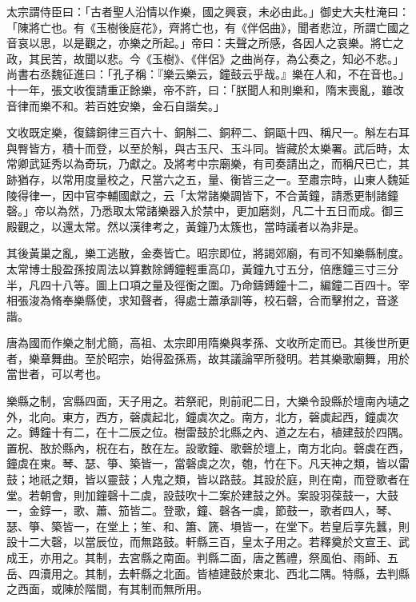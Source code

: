 \begin{pinyinscope}
 太宗謂侍臣曰：「古者聖人沿情以作樂，國之興衰，未必由此。」御史大夫杜淹曰：「陳將亡也。有《玉樹後庭花》，齊將亡也，有《伴侶曲》，聞者悲泣，所謂亡國之音哀以思，以是觀之，亦樂之所起。」帝曰：夫聲之所感，各因人之哀樂。將亡之政，其民苦，故聞以悲。今《玉樹》、《伴侶》之曲尚存，為公奏之，知必不悲。」尚書右丞魏征進曰：「孔子稱：『樂云樂云，鐘鼓云乎哉。』樂在人和，不在音也。」十一年，張文收復請重正餘樂，帝不許，曰：「朕聞人和則樂和，隋末喪亂，雖改音律而樂不和。若百姓安樂，金石自諧矣。」



 文收既定樂，復鑄銅律三百六十、銅斛二、銅秤二、銅甌十四、稱尺一。斛左右耳與臀皆方，積十而登，以至於斛，與古玉尺、玉斗同。皆藏於太樂署。武后時，太常卿武延秀以為奇玩，乃獻之。及將考中宗廟樂，有司奏請出之，而稱尺已亡，其跡猶存，以常用度量校之，尺當六之五，量、衡皆三之一。至肅宗時，山東人魏延陵得律一，因中官李輔國獻之，云「太常諸樂調皆下，不合黃鐘，請悉更制諸鐘磬。」帝以為然，乃悉取太常諸樂器入於禁中，更加磨剡，凡二十五日而成。御三殿觀之，以還太常。然以漢律考之，黃鐘乃太簇也，當時議者以為非是。



 其後黃巢之亂，樂工逃散，金奏皆亡。昭宗即位，將謁郊廟，有司不知樂縣制度。太常博士殷盈孫按周法以算數除鎛鐘輕重高卬，黃鐘九寸五分，倍應鐘三寸三分半，凡四十八等。圖上口項之量及徑衡之圍。乃命鑄鎛鐘十二，編鐘二百四十。宰相張浚為脩奉樂縣使，求知聲者，得處士蕭承訓等，校石磬，合而擊拊之，音遂諧。



 唐為國而作樂之制尤簡，高祖、太宗即用隋樂與孝孫、文收所定而已。其後世所更者，樂章舞曲。至於昭宗，始得盈孫焉，故其議論罕所發明。若其樂歌廟舞，用於當世者，可以考也。



 樂縣之制，宮縣四面，天子用之。若祭祀，則前祀二日，大樂令設縣於壇南內壝之外，北向。東方，西方，磬虡起北，鐘虡次之。南方，北方，磬虡起西，鐘虡次之。鎛鐘十有二，在十二辰之位。樹雷鼓於北縣之內、道之左右，植建鼓於四隅。置柷、敔於縣內，柷在右，敔在左。設歌鐘、歌磬於壇上，南方北向。磬虡在西，鐘虡在東。琴、瑟、箏、築皆一，當磬虡之次，匏，竹在下。凡天神之類，皆以雷鼓；地祇之類，皆以靈鼓；人鬼之類，皆以路鼓。其設於庭，則在南，而登歌者在堂。若朝會，則加鐘磬十二虡，設鼓吹十二案於建鼓之外。案設羽葆鼓一，大鼓一，金錞一，歌、蕭、笳皆二。登歌，鐘、磬各一虡，節鼓一，歌者四人，琴、瑟、箏、築皆一，在堂上；笙、和、簫、篪、塤皆一，在堂下。若皇后享先蠶，則設十二大磬，以當辰位，而無路鼓。軒縣三百，皇太子用之。若釋奠於文宣王、武成王，亦用之。其制，去宮縣之南面。判縣二面，唐之舊禮，祭風伯、雨師、五岳、四瀆用之。其制，去軒縣之北面。皆植建鼓於東北、西北二隅。特縣，去判縣之西面，或陳於階間，有其制而無所用。




\end{pinyinscope}
